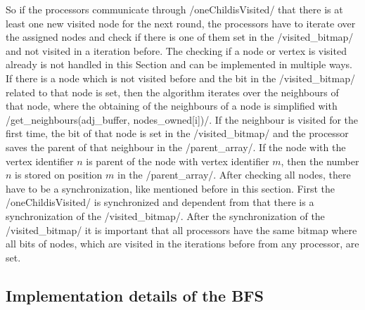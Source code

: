 \documentclass[12pt,a4paper]{article}
\begin{document}
So if the processors communicate through \cinline/oneChildisVisited/ that there is at least one new visited node for the next round, the processors have to iterate over the assigned nodes and check if there is one of them set in the \cinline/visited_bitmap/ and not visited in a iteration before. The checking if a node or vertex is visited already is not handled in this Section and can be implemented in multiple ways. If there is a node which is not visited before and the bit in the \cinline/visited_bitmap/ related to that node is set, then the algorithm iterates over the neighbours of that node, where the obtaining of the neighbours of a node is simplified with \cinline/get_neighbours(adj_buffer, nodes_owned[i])/. If the neighbour is visited for the first time, the bit of that node is set in the \cinline/visited_bitmap/ and the processor saves the parent of that neighbour in the \cinline/parent_array/. If the node with the vertex identifier \(n\) is parent of the node with vertex identifier \(m\), then the number \(n\) is stored on position \(m\) in the \cinline/parent_array/. After checking all nodes, there have to be a synchronization, like mentioned before in this section. First the \cinline/oneChildisVisited/ is synchronized and dependent from that there is a synchronization of the \cinline/visited_bitmap/. After the synchronization of the \cinline/visited_bitmap/ it is important that all processors have the same bitmap where all bits of nodes, which are visited in the iterations before from any processor, are set. 

\subsection{Implementation details of the BFS}
\label{sec:impl_details}
\end{document}
